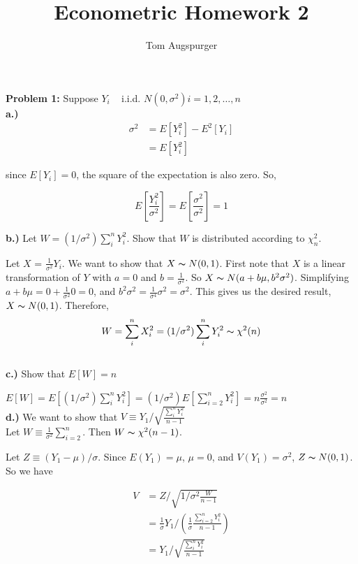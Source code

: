 \documentclass[11pt]{article}
\title{Econometric Homework 2}
\author{Tom Augspurger}
\begin{document}
\maketitle

\textbf{Problem 1:} Suppose $Y_{i}$ ~ i.i.d. $N(0, \sigma^{2}) i = 1, 2, \ldots, n$\\

\textbf{a.)}
\begin{align*}
    \sigma^{2} &= E[Y_{i}^{2}] - E^{2}[Y_{i}]\\
    &= E[Y_{i}^{2}]
\end{align*}

since $E[Y_{i}] = 0$, the square of the expectation is also zero.  So,

\begin{equation*}
    E\left[\frac{Y_{i}^{2}}{\sigma^{2}}\right] = E\left[\frac{\sigma^{2}}{\sigma^{2}}\right] = 1
\end{equation*}

\textbf{b.)} Let $W = (1/\sigma^{2})\sum_{i}^{n}Y_{i}^{2}$.  Show that $W$ is distributed according to $\chi_{n}^{2}$.

Let $X$ = $\frac{1}{\sigma^{2}} Y_{i}$.  We want to show that $X \thicksim N(0, 1)$.
First note that $X$ is a linear transformation of $Y$ with $a = 0$ and $b = \frac{1}{\sigma^{2}}$.  So $X \thicksim N(a + b\mu, b^{2}\sigma^{2})$. Simplifying $a + b\mu = 0 + \frac{1}{\sigma^{2}}0 = 0$, and $b^{2}\sigma^{2} = \frac{1}{\sigma^{4}}\sigma^{2} = \sigma^{2}$.  This gives us the desired result, $X \thicksim N(0, 1)$. Therefore, 
\[
    W = \sum_{i}^{n}X_{i}^{2} = (1/\sigma^{2})\sum_{i}^{n}Y_{i}^{2} \thicksim \chi^{2}(n)
\]\\

\textbf{c.)} Show that $E[W] = n$

$E[W] = E[(1/\sigma^{2}) \sum_{i}^{n}Y_{i}^{2}] = (1/\sigma^{2}) E[\sum_{i = 2}^{n}Y_{i}^{2}] = n\frac{\sigma^{2}}{\sigma^{2}} = n$\\


\textbf{d.)} We want to show that $V \equiv Y_{1} / \sqrt{\frac{\sum_{i}^{n}Y_{i}^{2}}{n - 1}}$\\

Let $W \equiv \frac{1}{\sigma^{2}}\sum_{i = 2}^{n}$.  Then $W \thicksim \chi^{2}(n - 1)$.

Let $Z \equiv (Y_{1} - \mu)/\sigma$.  Since $E(Y_{1}) = \mu$, $\mu = 0$, and $V(Y_{1}) = \sigma^{2}$, $Z \thicksim N(0, 1)$. So we have

\begin{align*}
    V &= Z/\sqrt{1 / \sigma^{2} \frac{W}{n - 1}}\\
    &= \frac{1}{\sigma}Y_{1} / (\frac{1}{\sigma}\frac{\sum_{i = 2}^{n} Y_{i}^{2}}{n - 1})\\
    &= Y_{1} / \sqrt{\frac{\sum_{i}^{n}Y_{i}^{2}}{n - 1}}
\end{align*}
\end{document}
